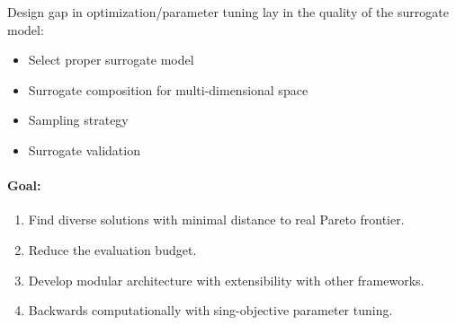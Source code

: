         Design gap in optimization/parameter tuning lay in the quality of the surrogate model:
            \begin{itemize}
                \item Select proper surrogate model
                \item Surrogate composition for multi-dimensional space
                \item Sampling strategy
                \item Surrogate validation
            \end{itemize}

        \paragraph{Goal:}
        \begin{enumerate}
            \item Find diverse solutions with minimal distance to real Pareto frontier.
            \item Reduce the evaluation budget.
            \item Develop modular architecture with extensibility with other frameworks. 
            \item Backwards computationally with sing-objective parameter tuning.
        \end{enumerate}








